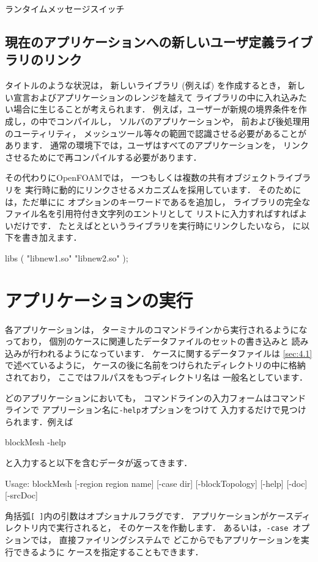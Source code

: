 \begin{table}[ht]
 
 \caption{ランタイムメッセージスイッチ}
 \label{tbl:3.3}
\end{table}


\subsection{現在のアプリケーションへの新しいユーザ定義ライブラリのリンク}
\label{ssec:3.2.6}
タイトルのような状況は，
新しいライブラリ (例えば) を作成するとき，
新しい宣言およびアプリケーションのレンジを越えて
ライブラリの中に入れ込みたい場合に生じることが考えられます．
例えば，ユーザーが新規の境界条件を作成し，の中でコンパイルし，
ソルバのアプリケーションや，
前および後処理用のユーティリティ，
メッシュツール等々の範囲で認識させる必要があることがあります．
通常の環境下では，ユーザはすべてのアプリケーションを，
リンクさせるためにで再コンパイルする必要があります．

その代わりにOpenFOAMでは，
一つもしくは複数の共有オブジェクトライブラリを
実行時に動的にリンクさせるメカニズムを採用しています．
そのためには，ただ単にに
オプションのキーワードであるを追加し，
ライブラリの完全なファイル名を引用符付き文字列のエントリとして
リストに入力すればすればよいだけです．
たとえばとというライブラリを実行時にリンクしたいなら，
に以下を書き加えます．
\begin{OFverbatim}[file]
libs
(
    "libnew1.so"
    "libnew2.so"
);
\end{OFverbatim}



\section{アプリケーションの実行}
\label{sec:3.3}
各アプリケーションは，
ターミナルのコマンドラインから実行されるようになっており，
個別のケースに関連したデータファイルのセットの書き込みと
読み込みが行われるようになっています．
ケースに関するデータファイルは
\autoref{sec:4.1}で述べているように，
ケースの後に名前をつけられたディレクトリの中に格納されており，
ここではフルパスをもつディレクトリ名は
一般名としています．

どのアプリケーションにおいても，
コマンドラインの入力フォームはコマンドラインで
アプリーション名に\verb|-help|オプションをつけて
入力するだけで見つけられます．例えば
\begin{OFverbatim}[terminal]
blockMesh -help
\end{OFverbatim}
と入力すると以下を含むデータが返ってきます．
\begin{OFverbatim}[terminal]
Usage: blockMesh [-region region name] [-case dir] [-blockTopology]
    [-help] [-doc] [-srcDoc]
\end{OFverbatim}
角括弧\texttt{[ ]}内の引数はオプショナルフラグです．
アプリケーションがケースディレクトリ内で実行されると，
そのケースを作動します．
あるいは，\texttt{-case}~オプションでは，
直接ファイリングシステムで
どこからでもアプリケーションを実行できるように
ケースを指定することもできます．

